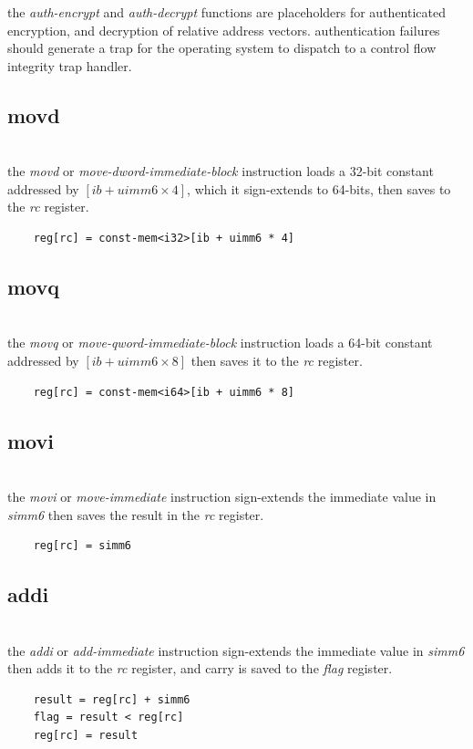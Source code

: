\par\noindent
the \emph{auth-encrypt} and \emph{auth-decrypt} functions are placeholders
for authenticated encryption, and decryption of relative address vectors.
authentication failures should generate a trap for the operating system to
dispatch to a control flow integrity trap handler.

\subsection{movd}
\\
the \emph{movd} or \emph{move-dword-immediate-block} instruction loads a
32-bit constant addressed by \emph{$[ib + uimm6 \times 4]$}, which it
sign-extends to 64-bits, then saves to the \emph{rc} register.
\begin{Verbatim}
    reg[rc] = const-mem<i32>[ib + uimm6 * 4]
\end{Verbatim}

\subsection{movq}
\\
the \emph{movq} or \emph{move-qword-immediate-block} instruction loads a
64-bit constant addressed by \emph{$[ib + uimm6 \times 8]$} then saves
it to the \emph{rc} register.
\begin{Verbatim}
    reg[rc] = const-mem<i64>[ib + uimm6 * 8]
\end{Verbatim}

\subsection{movi}
\\
the \emph{movi} or \emph{move-immediate} instruction sign-extends the
immediate value in \emph{simm6} then saves the result in the \emph{rc}
register.
\begin{Verbatim}
    reg[rc] = simm6
\end{Verbatim}

\subsection{addi}
\\
the \emph{addi} or \emph{add-immediate} instruction sign-extends the
immediate value in \emph{simm6} then adds it to the \emph{rc} register,
and carry is saved to the \emph{flag} register.
\begin{Verbatim}
    result = reg[rc] + simm6
    flag = result < reg[rc]
    reg[rc] = result
\end{Verbatim}


